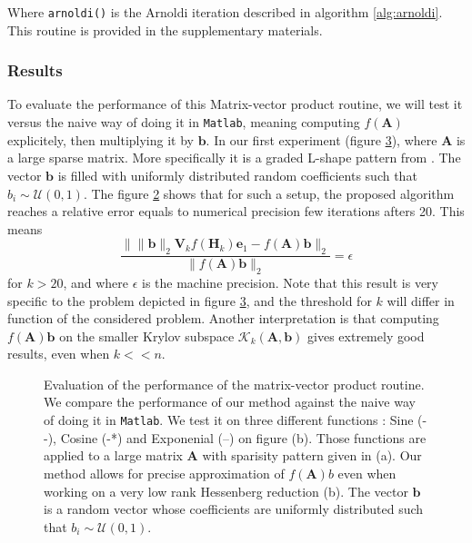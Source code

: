 \documentclass[11pt]{article}
\numberwithin{equation}{section}
\begin{document}
Where \texttt{arnoldi()} is the Arnoldi iteration described in algorithm \ref{alg:arnoldi}. This routine is provided in the supplementary materials.

\subsubsection{Results}
To evaluate the performance of this Matrix-vector product routine, we will test it versus the naive way of doing it in \texttt{Matlab}, meaning computing $f(\mathbf{A})$ explicitely, then multiplying it by $\mathbf{b}$. In our first experiment (figure \ref{fig:comp_fab}), where $\mathbf{A}$ is a large sparse matrix. More specifically it is a graded L-shape pattern from \cite{george1978automatic}. The vector $\mathbf{b}$ is filled with uniformly distributed random coefficients such that $b_i\sim\mathcal{U}(0,1)$. The figure \ref{fig:comp_fab_assignement} shows that for such a setup, the proposed algorithm reaches a relative error equals to numerical precision few iterations afters 20. This means 
\begin{equation*}
    \frac{\|\|\mathbf{b}\|_2\mathbf{V}_k f(\mathbf{H}_k)\mathbf{e}_1 - f(\mathbf{A})\mathbf{b}\|_2}{\|f(\mathbf{A})\mathbf{b}\|_2} = \epsilon
\end{equation*}
for $k > 20$, and where $\epsilon$ is the machine precision. Note that this result is very specific to the problem depicted in figure \ref{fig:comp_fab}, and the threshold for $k$ will differ in function of the considered problem. Another interpretation is that computing $f(\mathbf{A})\mathbf{b}$ on the smaller Krylov subspace $\mathcal{K}_k(\mathbf{A},\mathbf{b})$ gives extremely good results, even when $k << n$. 
\begin{figure}
    \begin{subfigure}[b]{.45\linewidth}
        
        \caption{}
        \label{fig:comp_fab_pattern}
    \end{subfigure}
    \begin{subfigure}[b]{.45\linewidth}
        
        \caption{}
        \label{fig:comp_fab_assignement}
    \end{subfigure}
    \caption{Evaluation of the performance of the matrix-vector product routine. We compare the performance of our method against the naive way of doing it in \texttt{Matlab}. We test it on three different functions : Sine (- -), Cosine (-*) and Exponenial (--) on figure (b). Those functions are applied to a large matrix $\mathbf{A}$ with sparisity pattern given in (a). Our method allows for precise approximation of $f(\mathbf{A})b$ even when working on a very low rank Hessenberg reduction (b). The vector $\mathbf{b}$ is a random vector whose coefficients are uniformly distributed such that $b_i\sim\mathcal{U}(0,1)$.}
    \label{fig:comp_fab}
\end{figure}
\end{document}

